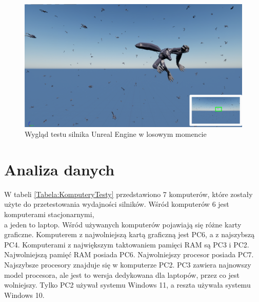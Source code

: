 \documentclass[12pt,twoside]{article}
\begin{document}
 


\begin{figure}[h]
    \centering
    \includegraphics[width=16cm]{figures/UnrealLupa.png}
    \caption{Wygląd testu silnika Unreal Engine w losowym momencie}
    \label{Fig:TESTUnrealScreenLUPA}
\end{figure}     


\clearpage
\section{Analiza danych}

W tabeli \ref{Tabela:KomputeryTesty} przedstawiono 7 komputerów, które zostały
użyte do przetestowania wydajności silników. Wśród komputerów 6 jest komputerami
stacjonarnymi,\\a jeden to laptop. Wśród używanych komputerów pojawiają się różne
karty graficzne. Komputerem z najwolniejszą kartą graficzną jest PC6, a z
najszybszą PC4. Komputerami z największym taktowaniem pamięci RAM są PC3
i PC2. Najwolniejszą pamięć RAM posiada PC6. Najwolniejszy procesor posiada PC7.
Najszybsze procesory znajduje się w komputerze PC2. PC3 zawiera najnowszy model
procesora, ale jest to wersja dedykowana dla laptopów, przez co jest wolniejszy.
Tylko PC2 używał systemu Windows 11, a reszta używała systemu Windows 10.  
\end{document}
